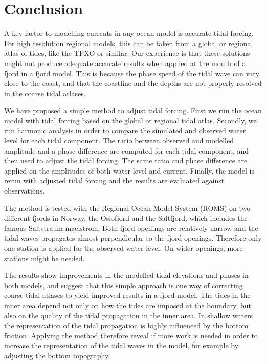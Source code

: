 \section{Conclusion}

A key factor to modelling currents in any ocean model is accurate tidal forcing. For high resolution regional models, this can be taken from a global or regional atlas of tides, like the TPXO or similar. Our experience is that these solutions might not produce adequate accurate results when applied at the mouth of a fjord in a fjord model. This is because the phase speed of the tidal wave can vary close to the coast, and that the coastline and the depths are not properly resolved in the coarse tidal atlases.

We have proposed a simple method to adjust tidal forcing. First we run the ocean model with tidal forcing based on the global or regional tidal atlas. Secondly, we run harmonic analysis in order to compare the simulated and observed water level for each tidal component. The ratio between observed and modelled amplitude and a phase difference are computed for each tidal component, and then used to adjust the tidal forcing. The same ratio and phase difference are applied on the amplitudes of both water level and current. Finally, the model is rerun with adjusted tidal forcing and the results are evaluated against observations.

The method is tested with the Regional Ocean Model System (ROMS) on two different fjords in Norway, the Oslofjord and the Saltfjord, which includes the famous Saltstraum maelstrom. Both fjord openings are relatively narrow and the tidal waves propagates almost perpendicular to the fjord openings. Therefore only one station is applied for the observed water level. On wider openings, more stations might be needed. 
 
The results show improvements in the modelled tidal elevations and phases in both models, and suggest that this simple approach is one way of correcting coarse tidal atlases to yield improved results in a fjord model. The tides in the inner area depend not only on how the tides are imposed at the boundary, but also on the quality of the tidal propagation in the inner area. In shallow waters the representation of the tidal propagation is highly influenced by the bottom friction. Applying the method therefore reveal if more work is needed in order to increase the representation of the tidal waves in the model, for example by adjusting the bottom topography.
